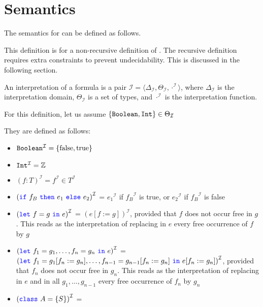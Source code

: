 \section{Semantics}

\newcommand{\I}[1]{\ensuremath{{#1}^{\mathcal{I}}}}


The semantics for \Soda can be defined as follows.

This definition is for a non-recursive definition of \Soda.
The recursive definition requires extra constraints to prevent undecidability.
This is discussed in the following section.

An interpretation of a \Soda formula is a pair $\mathcal{I} = \langle \Delta _{\mathcal{I}} , \Theta _{\mathcal{I}}, \I{\cdot} \rangle$, where $\Delta _{\mathcal{I}}$ is the interpretation domain, $\Theta _{\mathcal{I}}$ is a set of types, and $\I{\cdot}$ is the interpretation function.

For this definition, let us assume $\{\texttt{{Boolean}}, \texttt{{Int}}\} \in \Theta _{\mathcal{I}}$

They are defined as follows:

\begin{itemize}
    \item $\I{\srccode{Boolean}} = \{\text{false}, \text{true}\}$
    \item $\I{\srccode{Int}} = \mathbb{Z}$
    \item $\I{(f : T)} = \I{f} \in \I{T}$
    \item $\I{(\sif\ f_{B} \ \sthen\ e_{1} \ \selse\ e_{2})}$ = $\I{e_{1}}$ if $\I{f_{B}}$ is true, or $\I{e_{2}}$ if $\I{f_{B}}$ is false

    \item $\I{(\slet\ f = g \ \sdin\ e)}$ =
    \I{(e[f := g])}, provided that $f$ does not occur free in $g$.
    This reads as the interpretation of
    replacing in $e$ every free occurrence of $f$ by $g$

    \item $\I{(\slet\ f_{1} = g_{1}, \ldots , f_{n} = g_{n} \ \sdin\ e)}$ = \\
    $\I{(\slet\ f_{1} = g_{1}[f_{n} := g_{n}], \ldots , f_{n - 1} = g_{n - 1}[f_{n} := g_{n}] \ \sdin\ e[f_{n} := g_{n}])}$, provided that $f_{n}$ does not occur free in $g_{n}$.
    This reads as the interpretation of
    replacing in $e$ and in all $g_{1}, \ldots , g_{n - 1}$ every free occurrence of $f_{n}$ by $g_{n}$

    \item $\I{(\sclass\ A = \{ S \})}$ =
\end{itemize}


